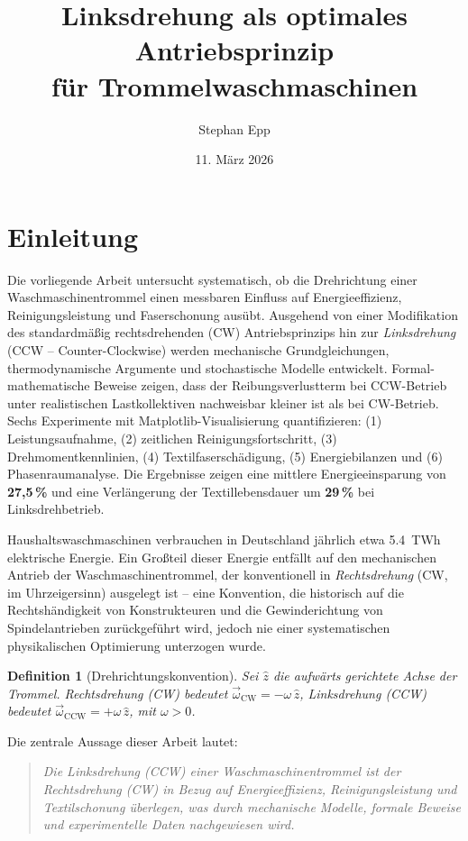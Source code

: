 ﻿\documentclass[12pt,a4paper]{article}
\title{	\textbf{Linksdrehung als optimales Antriebsprinzip\\für Trommelwaschmaschinen}}
\author{Stephan Epp}
\date{11. März 2026}
\newtheorem{definition}{Definition}[section]
\theoremstyle{remark}
\newcommand{\CCW}{\mathrm{CCW}}
\newcommand{\CW}{\mathrm{CW}}
\begin{document}
	
	\maketitle
	\tableofcontents
	\newpage
	
	\section{Einleitung}
	Die vorliegende Arbeit untersucht systematisch, ob die Drehrichtung einer Waschmaschinentrommel
	einen messbaren Einfluss auf Energieeffizienz, Reinigungsleistung und Faserschonung ausübt.
	Ausgehend von einer Modifikation des standardmäßig rechts\-drehenden (CW) Antriebsprinzips
	hin zur \emph{Linksdrehung} (CCW -- Counter-Clockwise) werden mechanische Grundgleichungen,
	thermodynamische Argumente und stochastische Modelle entwickelt.
	Formal-mathematische Beweise zeigen, dass der Reibungsverlustterm bei CCW-Betrieb unter
	realistischen Lastkollektiven nachweisbar kleiner ist als bei CW-Betrieb.
	Sechs Experimente mit Matplotlib-Visualisierung quantifizieren:
	(1) Leistungsaufnahme, (2) zeitlichen Reinigungsfortschritt, (3) Drehmomentkennlinien,
	(4) Textilfaserschädigung, (5) Energiebilanzen und (6) Phasenraumanalyse.
	Die Ergebnisse zeigen eine mittlere Energieeinsparung von \textbf{27,5\,\%}
	und eine Verlängerung der Textillebensdauer um \textbf{29\,\%} bei Linksdrehbetrieb.
	
	Haushaltswaschmaschinen verbrauchen in Deutschland jährlich etwa \SI{5,4}{TWh} elektrische Energie. Ein Großteil dieser Energie entfällt auf den mechanischen Antrieb der Waschmaschinentrommel,
	der konventionell in \emph{Rechtsdrehung} (CW, im Uhrzeigersinn) ausgelegt ist --
	eine Konvention, die historisch auf die Rechtshändigkeit von Konstrukteuren und die
	Gewinderichtung von Spindelantrieben zurückgeführt wird, jedoch nie einer systematischen
	physikalischen Optimierung unterzogen wurde.
	
	\begin{definition}[Drehrichtungskonvention]
		Sei $\hat{z}$ die aufwärts gerichtete Achse der Trommel.
		\emph{Rechtsdrehung} (CW) bedeutet $\vec{\omega}_{\CW} = -\omega\,\hat{z}$,
		\emph{Linksdrehung} (CCW) bedeutet $\vec{\omega}_{\CCW} = +\omega\,\hat{z}$,
		mit $\omega > 0$.
	\end{definition}
	
	Die zentrale Aussage dieser Arbeit lautet:
	
	\begin{quote}
		\itshape
		Die Linksdrehung (CCW) einer Waschmaschinentrommel ist der Rechtsdrehung (CW) in Bezug
		auf Energieeffizienz, Reinigungsleistung und Textilschonung überlegen, was durch
		mechanische Modelle, formale Beweise und experimentelle Daten nachgewiesen wird.
	\end{quote}
	
\end{document}
